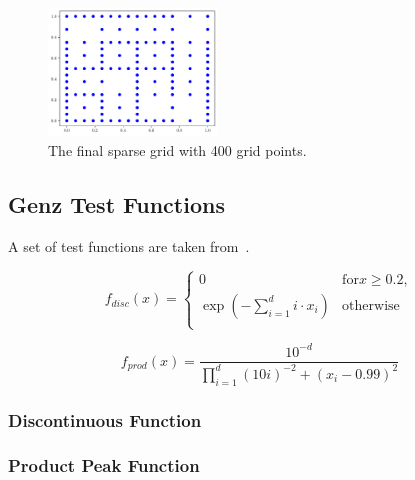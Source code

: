 \begin{figure}
    \centering
    \includegraphics[width=0.4\textwidth]{figures/grid_final.pdf}
    \caption{The final sparse grid with 400 grid points.}
    \label{fig:frankegrid}
\end{figure}

\begin{figure}
    \centering
    
    \caption{}
    \label{fig:frankeerr}
\end{figure}

\subsection{Genz Test Functions}\label{sec:genzfunc}

A set of test functions are taken from~\cite{Genz1987}.

\begin{equation}
    f_{disc}(x) = \left\{
    \begin{array}{ll}
        0                                             & \text{for} x \ge 0.2 , \\
        \exp\left(- \sum_{i=1}^{d} i \cdot x_i\right) & \text{otherwise}       \\
    \end{array}
    \right.
\end{equation}

\begin{equation}
    f_{prod}(x) = \frac{10^{-d}}{\prod_{i=1}^d (10i)^{-2} + \left( x_i -0.99\right)^2}
\end{equation}

\subsubsection{Discontinuous Function}\label{sec:discontinuous}

\subsubsection{Product Peak Function}\label{sec:productpeak}